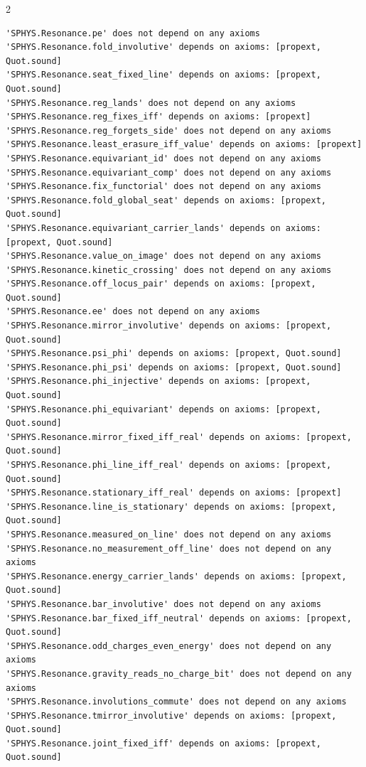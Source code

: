 \documentclass[10pt]{article}
\begin{document}
\begin{multicols}{2}
\begin{Verbatim}[fontsize=\fontsize{5.9}{6.8}\selectfont,breaklines,breakanywhere,breaksymbolleft={}]
'SPHYS.Resonance.pe' does not depend on any axioms
'SPHYS.Resonance.fold_involutive' depends on axioms: [propext, Quot.sound]
'SPHYS.Resonance.seat_fixed_line' depends on axioms: [propext, Quot.sound]
'SPHYS.Resonance.reg_lands' does not depend on any axioms
'SPHYS.Resonance.reg_fixes_iff' depends on axioms: [propext]
'SPHYS.Resonance.reg_forgets_side' does not depend on any axioms
'SPHYS.Resonance.least_erasure_iff_value' depends on axioms: [propext]
'SPHYS.Resonance.equivariant_id' does not depend on any axioms
'SPHYS.Resonance.equivariant_comp' does not depend on any axioms
'SPHYS.Resonance.fix_functorial' does not depend on any axioms
'SPHYS.Resonance.fold_global_seat' depends on axioms: [propext, Quot.sound]
'SPHYS.Resonance.equivariant_carrier_lands' depends on axioms: [propext, Quot.sound]
'SPHYS.Resonance.value_on_image' does not depend on any axioms
'SPHYS.Resonance.kinetic_crossing' does not depend on any axioms
'SPHYS.Resonance.off_locus_pair' depends on axioms: [propext, Quot.sound]
'SPHYS.Resonance.ee' does not depend on any axioms
'SPHYS.Resonance.mirror_involutive' depends on axioms: [propext, Quot.sound]
'SPHYS.Resonance.psi_phi' depends on axioms: [propext, Quot.sound]
'SPHYS.Resonance.phi_psi' depends on axioms: [propext, Quot.sound]
'SPHYS.Resonance.phi_injective' depends on axioms: [propext, Quot.sound]
'SPHYS.Resonance.phi_equivariant' depends on axioms: [propext, Quot.sound]
'SPHYS.Resonance.mirror_fixed_iff_real' depends on axioms: [propext, Quot.sound]
'SPHYS.Resonance.phi_line_iff_real' depends on axioms: [propext, Quot.sound]
'SPHYS.Resonance.stationary_iff_real' depends on axioms: [propext]
'SPHYS.Resonance.line_is_stationary' depends on axioms: [propext, Quot.sound]
'SPHYS.Resonance.measured_on_line' does not depend on any axioms
'SPHYS.Resonance.no_measurement_off_line' does not depend on any axioms
'SPHYS.Resonance.energy_carrier_lands' depends on axioms: [propext, Quot.sound]
'SPHYS.Resonance.bar_involutive' does not depend on any axioms
'SPHYS.Resonance.bar_fixed_iff_neutral' depends on axioms: [propext, Quot.sound]
'SPHYS.Resonance.odd_charges_even_energy' does not depend on any axioms
'SPHYS.Resonance.gravity_reads_no_charge_bit' does not depend on any axioms
'SPHYS.Resonance.involutions_commute' does not depend on any axioms
'SPHYS.Resonance.tmirror_involutive' depends on axioms: [propext, Quot.sound]
'SPHYS.Resonance.joint_fixed_iff' depends on axioms: [propext, Quot.sound]

\end{Verbatim}
\end{multicols}
\end{document}
